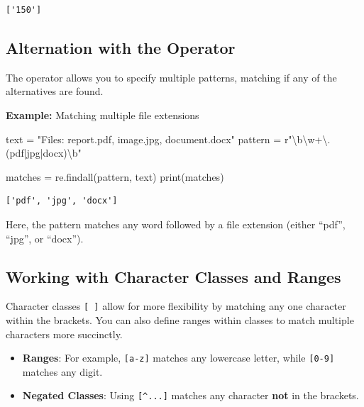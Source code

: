 \documentclass[
  letterpaper,
  DIV=11,
  numbers=noendperiod]{scrreprt}
\newenvironment{Shaded}{\begin{snugshade}}{\end{snugshade}}
\newcommand{\BuiltInTok}[1]{\textcolor[rgb]{0.00,0.23,0.31}{#1}}
\newcommand{\NormalTok}[1]{\textcolor[rgb]{0.00,0.23,0.31}{#1}}
\newcommand{\OperatorTok}[1]{\textcolor[rgb]{0.37,0.37,0.37}{#1}}
\newcommand{\StringTok}[1]{\textcolor[rgb]{0.13,0.47,0.30}{#1}}
\newcommand{\VerbatimStringTok}[1]{\textcolor[rgb]{0.13,0.47,0.30}{#1}}
\providecommand{\tightlist}{%
  \setlength{\itemsep}{0pt}\setlength{\parskip}{0pt}}\usepackage{longtable,booktabs,array}
\begin{document}
\begin{verbatim}
['150']
\end{verbatim}

\hypertarget{alternation-with-the-operator}{%
\subsection{\texorpdfstring{Alternation with the \texttt{\textbar{}}
Operator}{Alternation with the \textbar{} Operator}}\label{alternation-with-the-operator}}

The \texttt{\textbar{}} operator allows you to specify multiple
patterns, matching if any of the alternatives are found.

\textbf{Example:} Matching multiple file extensions

\begin{Shaded}
\begin{Highlighting}[]
\NormalTok{text }\OperatorTok{=} \StringTok{"Files: report.pdf, image.jpg, document.docx"}
\NormalTok{pattern }\OperatorTok{=} \VerbatimStringTok{r"\textbackslash{}b\textbackslash{}w+\textbackslash{}.(pdf|jpg|docx)\textbackslash{}b"}

\NormalTok{matches }\OperatorTok{=}\NormalTok{ re.findall(pattern, text)}
\BuiltInTok{print}\NormalTok{(matches)  }
\end{Highlighting}
\end{Shaded}

\begin{verbatim}
['pdf', 'jpg', 'docx']
\end{verbatim}

Here, the pattern matches any word followed by a file extension (either
``pdf'', ``jpg'', or ``docx'').

\hypertarget{working-with-character-classes-and-ranges}{%
\subsection{Working with Character Classes and
Ranges}\label{working-with-character-classes-and-ranges}}

Character classes \texttt{{[}\ {]}} allow for more flexibility by
matching any one character within the brackets. You can also define
ranges within classes to match multiple characters more succinctly.

\begin{itemize}
\tightlist
\item
  \textbf{Ranges}: For example, \texttt{{[}a-z{]}} matches any lowercase
  letter, while \texttt{{[}0-9{]}} matches any digit.
\item
  \textbf{Negated Classes}: Using \texttt{{[}\^{}...{]}} matches any
  character \textbf{not} in the brackets.
\end{itemize}
\end{document}
